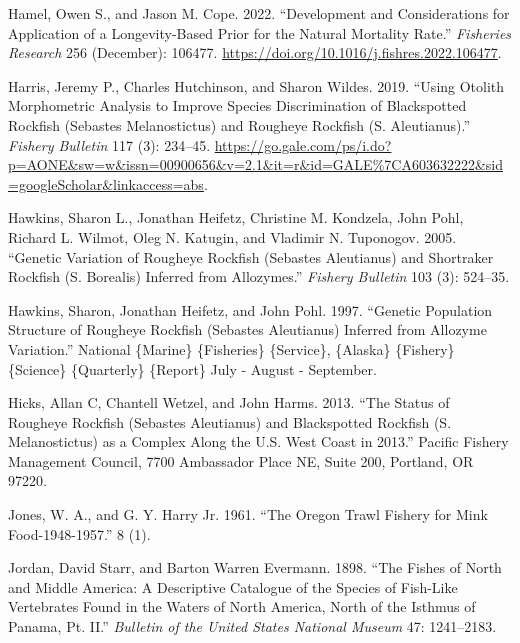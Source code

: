 \documentclass[
]{scrartcl}
\newlength{\cslhangindent}
\newenvironment{CSLReferences}[2] %
 {\begin{list}{}{%
  \setlength{\itemindent}{0pt}
  \setlength{\leftmargin}{0pt}
  \setlength{\parsep}{0pt}
  \ifodd #1
   \setlength{\leftmargin}{\cslhangindent}
   \setlength{\itemindent}{-1\cslhangindent}
  \fi
  \setlength{\itemsep}{#2\baselineskip}}}
 {\end{list}}
\begin{document}
\begin{CSLReferences}{1}{0}
Hamel, Owen S., and Jason M. Cope. 2022. {``Development and
Considerations for Application of a Longevity-Based Prior for the
Natural Mortality Rate.''} \emph{Fisheries Research} 256 (December):
106477. \url{https://doi.org/10.1016/j.fishres.2022.106477}.

Harris, Jeremy P., Charles Hutchinson, and Sharon Wildes. 2019. {``Using
Otolith Morphometric Analysis to Improve Species Discrimination of
Blackspotted Rockfish ({Sebastes} Melanostictus) and Rougheye Rockfish
({S}. Aleutianus).''} \emph{Fishery Bulletin} 117 (3): 234--45.
\url{https://go.gale.com/ps/i.do?p=AONE&sw=w&issn=00900656&v=2.1&it=r&id=GALE\%7CA603632222&sid=googleScholar&linkaccess=abs}.

Hawkins, Sharon L., Jonathan Heifetz, Christine M. Kondzela, John Pohl,
Richard L. Wilmot, Oleg N. Katugin, and Vladimir N. Tuponogov. 2005.
{``Genetic Variation of Rougheye Rockfish ({Sebastes} Aleutianus) and
Shortraker Rockfish ({S}. Borealis) Inferred from Allozymes.''}
\emph{Fishery Bulletin} 103 (3): 524--35.

Hawkins, Sharon, Jonathan Heifetz, and John Pohl. 1997. {``Genetic
Population Structure of Rougheye Rockfish ({Sebastes} Aleutianus)
Inferred from Allozyme Variation.''} National \{Marine\} \{Fisheries\}
\{Service\}, \{Alaska\} \{Fishery\} \{Science\} \{Quarterly\} \{Report\}
July - August - September.

Hicks, Allan C, Chantell Wetzel, and John Harms. 2013. {``The Status of
Rougheye Rockfish ({Sebastes} Aleutianus) and Blackspotted Rockfish
({S}. Melanostictus) as a Complex Along the {U}.{S}. {West} {Coast} in
2013.''} Pacific Fishery Management Council, 7700 Ambassador Place NE,
Suite 200, Portland, OR 97220.

Jones, W. A., and G. Y. Harry Jr. 1961. {``The {Oregon} {Trawl}
{Fishery} for {Mink} {Food}-1948-1957.''} 8 (1).

Jordan, David Starr, and Barton Warren Evermann. 1898. {``The Fishes of
{North} and {Middle} {America}: {A} Descriptive Catalogue of the Species
of Fish-Like Vertebrates Found in the Waters of {North} {America}, North
of the {Isthmus} of {Panama}, Pt. {II}.''} \emph{Bulletin of the United
States National Museum} 47: 1241--2183.


\end{CSLReferences}
\end{document}
